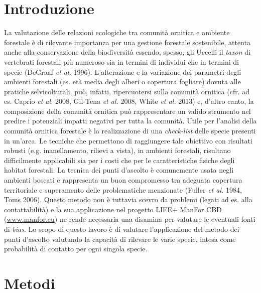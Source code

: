 \section*{Introduzione}
{{La valutazione delle relazioni ecologiche
tra comunit\`a ornitica e ambiente forestale \`e di rilevante
importanza per una gestione forestale sostenibile, attenta anche alla
conservazione della biodiversit\`a essendo, spesso, gli Uccelli il
}\textit{{taxon}}{
di vertebrati forestali pi\`u numeroso sia in termini di individui che
in termini di specie (DeGraaf }\textit{{et
al. }}{1996). L{\textquoteright}alterazione
e la variazione dei parametri degli ambienti forestali (es. et\`a media
degli alberi o copertura fogliare) dovuta alle pratiche selvicolturali,
pu\`o, infatti, ripercuotersi sulla comunit\`a ornitica (cfr. ad es.
Caprio }\textit{{et
al.}}{ 2008, Gil-Tena
}\textit{{et
al.}}{ 2008, White
}\textit{{et
al.}}{ 2013) e, d{\textquoteright}altro
canto, la composizione della comunit\`a ornitica pu\`o rappresentare un
valido strumento nel predire i potenziali impatti negativi per tutta la
comunit\`a. Utile per l{\textquoteright}analisi della comunit\`a
ornitica forestale \`e la realizzazione di una
}\textit{{check-list}}{
delle specie presenti in un{\textquoteright}area. Le tecniche che
permettono di raggiungere tale obiettivo con risultati robusti (e.g.
inanellamento, rilievi a vista), in ambienti forestali, risultano
difficilmente applicabili sia per i costi che per le caratteristiche
fisiche degli habitat forestali. La tecnica dei punti
d{\textquoteright}ascolto \`e comunemente usata negli ambienti boscati
e rappresenta un buon compromesso tra adeguata copertura territoriale e
superamento delle problematiche menzionate (Fuller
}\textit{{et
al.}}{ 1984, Toms 2006). Questo metodo non
\`e tuttavia scevro da problemi (legati ad es. alla contattabilit\`a) e
la sua applicazione nel progetto LIFE+ ManFor CBD (\url{www.manfor.eu}) ne
rende necessaria una disamina per valutare le eventuali fonti di
}\textit{{bias}}. 
Lo scopo di questo lavoro \`e di valutare l{\textquoteright}applicazione del metodo dei punti
d{\textquoteright}ascolto valutando la capacit\`a di rilevare le varie
specie, intesa come probabilit\`a di contatto per ogni singola
specie.}

\section*{Metodi}

